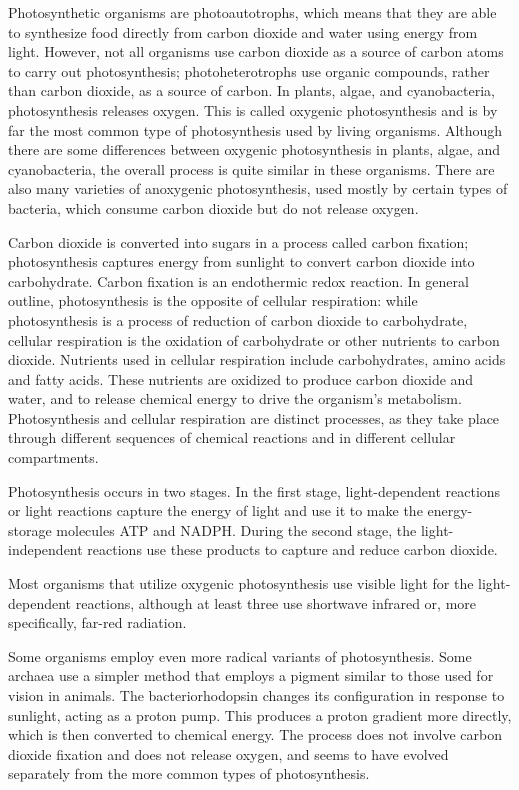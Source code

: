 Photosynthetic organisms are photoautotrophs, which means that they are able to synthesize food directly from carbon dioxide and water using energy from light. However, not all organisms use carbon dioxide as a source of carbon atoms to carry out photosynthesis; photoheterotrophs use organic compounds, rather than carbon dioxide, as a source of carbon. In plants, algae, and cyanobacteria, photosynthesis releases oxygen. This is called oxygenic photosynthesis and is by far the most common type of photosynthesis used by living organisms. Although there are some differences between oxygenic photosynthesis in plants, algae, and cyanobacteria, the overall process is quite similar in these organisms. There are also many varieties of anoxygenic photosynthesis, used mostly by certain types of bacteria, which consume carbon dioxide but do not release oxygen.

Carbon dioxide is converted into sugars in a process called carbon fixation; photosynthesis captures energy from sunlight to convert carbon dioxide into carbohydrate. Carbon fixation is an endothermic redox reaction. In general outline, photosynthesis is the opposite of cellular respiration: while photosynthesis is a process of reduction of carbon dioxide to carbohydrate, cellular respiration is the oxidation of carbohydrate or other nutrients to carbon dioxide. Nutrients used in cellular respiration include carbohydrates, amino acids and fatty acids. These nutrients are oxidized to produce carbon dioxide and water, and to release chemical energy to drive the organism's metabolism. Photosynthesis and cellular respiration are distinct processes, as they take place through different sequences of chemical reactions and in different cellular compartments.

Photosynthesis occurs in two stages. In the first stage, light-dependent reactions or light reactions capture the energy of light and use it to make the energy-storage molecules ATP and NADPH. During the second stage, the light-independent reactions use these products to capture and reduce carbon dioxide.

Most organisms that utilize oxygenic photosynthesis use visible light for the light-dependent reactions, although at least three use shortwave infrared or, more specifically, far-red radiation.

Some organisms employ even more radical variants of photosynthesis. Some archaea use a simpler method that employs a pigment similar to those used for vision in animals. The bacteriorhodopsin changes its configuration in response to sunlight, acting as a proton pump. This produces a proton gradient more directly, which is then converted to chemical energy. The process does not involve carbon dioxide fixation and does not release oxygen, and seems to have evolved separately from the more common types of photosynthesis.

